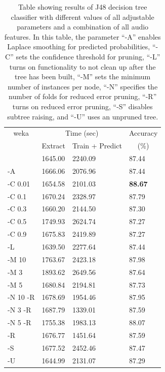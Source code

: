 \documentclass[12pt,oneside]{book}
\begin{document}
\begin{table}
\begin{tabular}{|l|l|l|l|}
\hline
\multicolumn{1}{|c|}{weka} & \multicolumn{2}{c|}{Time (sec)} & Accuracy \\
\hhline{|~|-|-|~|}
\multicolumn{1}{|c|}{param} & Extract & Train + Predict & \multicolumn{1}{c|}{(\%)} \\
\hhline{|=|=|=|=|}
           &  1645.00  &    2240.09  &  87.44  \\
 -A        &  1666.06  &    2076.96  &  87.44  \\
 -C 0.01   &  1654.58  &    2101.03  &  \textbf{88.67}  \\
 -C 0.1    &  1670.24  &    2328.97  &  87.79  \\
 -C 0.3    &  1660.20  &    2144.50  &  87.30  \\
 -C 0.5    &  1749.93  &    2624.74  &  87.27  \\
 -C 0.9    &  1675.83  &    2419.89  &  87.27  \\
 -L        &  1639.50  &    2277.64  &  87.44  \\
\hline
 -M 10     &  1763.67  &    2423.18  &  87.98  \\
 -M 3      &  1893.62  &    2649.56  &  87.64  \\
 -M 5      &  1680.84  &    2194.81  &  87.73  \\
 -N 10 -R  &  1678.69  &    1954.46  &  87.95  \\
 -N 3 -R   &  1687.79  &    1339.01  &  87.59  \\
 -N 5 -R   &  1755.38  &    1983.13  &  88.07  \\
 -R        &  1676.77  &    1451.64  &  87.59  \\
 -S        &  1677.52  &    2452.46  &  87.47  \\
 -U        &  1644.99  &    2131.07  &  87.29  \\
\hline
\end{tabular}
\caption{Table showing results of J48 decision tree classifier with
  different values of all adjustable parameters and a combination of
  all audio features.  In this table, the parameter ``-A'' enables
  Laplace smoothing for predicted probabilities, ``-C'' sets the
  confidence threshold for pruning, ``-L'' turns on functionality to
  not clean up after the tree has been built, ``-M'' sets the minimum
  number of instances per node, ``-N'' specifies the number of folds
  for reduced error pruning, ``-R'' turns on reduced error pruning,
  ``-S'' disables subtree raising, and ``-U'' uses an unpruned tree. }
\label{table:obv-weka-j48}
\end{table}
\end{document}
